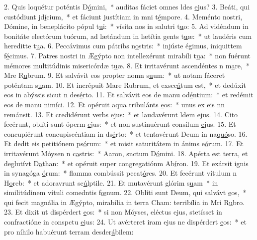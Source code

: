 2. Quis loquétur poténtis D\uline{ó}mini,~* audítas fáciet omnes ldes \uline{e}jus?
3. Beáti, qui custódiunt jd\uline{í}cium,~* et fáciunt justítiam in mni t\uline{é}mpore.
4. Meménto nostri, Dómine, in beneplácito pópul t\uline{u}i:~* vísita nos in salutri t\uline{u}o:
5. Ad vidéndum in bonitáte electórum tuórum, ad lætándum in lætítia gents t\uline{u}æ:~* ut laudéris cum hereditte t\uline{u}a.
6. Peccávimus cum pátribs n\uline{o}stris:~* injúste égimus, iniquittem f\uline{é}cimus.
7. Patres nostri in Ægýpto non intellexérunt mirabíli t\uline{u}a:~* non fuérunt mémores multitúdinis misericórdæ t\uline{u}æ.
8. Et irritavérunt ascendéntes n m\uline{a}re,~* Mre R\uline{u}brum.
9. Et salvávit eos propter nomn s\uline{u}um:~* ut notam fáceret poténtam s\uline{u}am.
10. Et incrépuit Mare Rubrum, et exscc\uline{á}tum est,~* et dedúxit eos in abýssis sicut n des\uline{é}rto.
11. Et salvávit eos de manu od\uline{é}ntium:~* et redémit eos de manu nim\uline{í}ci.
12. Et opéruit aqua tribulánts \uline{e}os:~* unus ex eis nn rem\uline{á}nsit.
13. Et credidérunt verbs \uline{e}jus:~* et laudavérunt ldem \uline{e}jus.
14. Cito fecérunt, oblíti sunt óperm \uline{e}jus:~* et non sustinuérunt consílum \uline{e}jus.
15. Et concupiérunt concupiscéntiam in ds\uline{é}rto:~* et tentavérunt Deum in na\uline{quó}so.
16. Et dedit eis petitiónem ps\uline{ó}rum:~* et misit saturitátem in ánims e\uline{ó}rum.
17. Et irritavérunt Móysen n c\uline{a}stris:~* Aaron, snctum D\uline{ó}mini.
18. Apérta est terra, et deglutívt D\uline{a}than:~* et opéruit super congregatiónm Ab\uline{í}ron.
19. Et exársit ignis in synagóga \uline{ó}rum:~* flamma combússit pccat\uline{ó}res.
20. Et fecérunt vítulum n H\uline{o}reb:~* et adoravrunt sc\uline{ú}lptile.
21. Et mutavérunt glórim s\uline{u}am~* in similitúdinem vítuli comedntis f\uline{œ}num.
22. Oblíti sunt Deum, qui salvávt \uline{e}os,~* qui fecit magnália in Ægýpto, mirabília in terra Cham: terribília in Mri R\uline{u}bro.
23. Et dixit ut dispérdert \uline{e}os:~* si non Móyses, eléctus ejus, stetísset in confractióne in conspctu \uline{e}jus:
24. Ut avérteret iram ejus ne dispérdert \uline{e}os:~* et pro níhilo habuérunt terram desder\uline{á}bilem:
